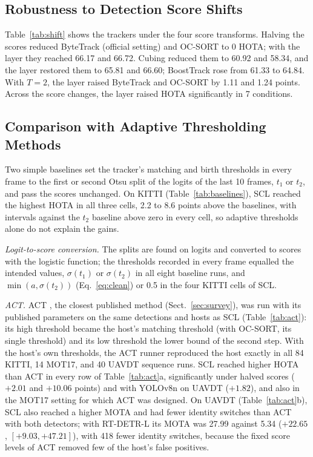 \documentclass[pdflatex,sn-mathphys-num,iicol]{sn-jnl}
\newcommand{\scl}{SCL}
\begin{document}
\subsection{Robustness to Detection Score Shifts}\label{sec:shift}
Table~\ref{tab:shift} shows the trackers under the four score transforms. Halving the scores
reduced ByteTrack (official setting) and OC-SORT to 0 HOTA; with the layer they reached 66.17 and
66.72. Cubing reduced them to 60.92 and 58.34, and the layer restored them to 65.81 and 66.60;
BoostTrack rose from 61.33 to 64.84. With $T=2$, the layer raised ByteTrack and OC-SORT by 1.11 and
1.24 points. Across the score changes, the layer raised HOTA significantly in 7 conditions.

\subsection{Comparison with Adaptive Thresholding Methods}\label{sec:baselines}
Two simple baselines set the tracker's matching and birth thresholds in every frame to the first or
second Otsu split of the logits of the last 10 frames, $t_1$ or $t_2$, and pass the scores
unchanged. On KITTI (Table~\ref{tab:baselines}), \scl{} reached the highest HOTA in all three
cells, 2.2 to 8.6 points above the baselines, with intervals against the $t_2$ baseline above zero
in every cell, so adaptive thresholds alone do not explain the gains.

\emph{Logit-to-score conversion.} The splits are found on logits and converted to scores with the
logistic function; the thresholds recorded in every frame equalled the intended values, $\sigma(t_1)$
or $\sigma(t_2)$ in all eight baseline runs, and $\min(a,\sigma(t_2))$ (Eq.~\eqref{eq:clean}) or 0.5
in the four KITTI cells of \scl{}.

\emph{ACT.} ACT \cite{act2026adaptive}, the closest published method (Sect.~\ref{sec:survey}), was run with its published parameters on the same detections and hosts as
\scl{} (Table~\ref{tab:act}): its high threshold became the host's matching threshold (with OC-SORT,
its single threshold) and its low threshold the lower bound of the second step. With the host's own
thresholds, the ACT runner reproduced the host exactly in all 84 KITTI, 14 MOT17, and 40 UAVDT
sequence runs. \scl{} reached
higher HOTA than ACT in every row of Table~\ref{tab:act}a, significantly under halved scores
($+2.01$ and $+10.06$ points) and with YOLOv8n on UAVDT ($+1.82$), and also in the MOT17 setting for
which ACT was designed. On UAVDT (Table~\ref{tab:act}b), \scl{} also reached a higher MOTA and had
fewer identity switches than ACT with both detectors; with RT-DETR-L its MOTA was 27.99 against 5.34
($+22.65$, $[+9.03,+47.21]$), with 418 fewer identity switches, because the fixed score levels of
ACT removed few of the host's false positives.
\end{document}
